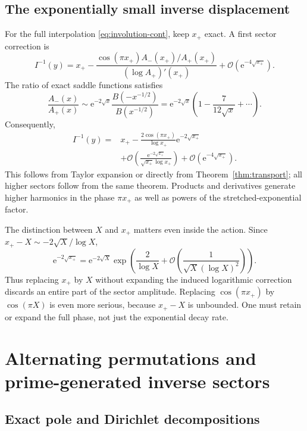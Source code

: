\documentclass[11pt,a4paper]{article}
\numberwithin{equation}{section}
\theoremstyle{definition}
\theoremstyle{remark}
\newcommand{\ee}{\mathrm e}
\newcommand{\bigO}{\mathcal O}
\begin{document}
\subsection{The exponentially small inverse displacement}

For the full interpolation \eqref{eq:involution-cont}, keep $x_+$ exact. A first sector correction is
\begin{equation}
 I^{-1}(y)=x_+-
 \frac{\cos(\pi x_+)A_-(x_+)/A_+(x_+)}{(\log A_+)'(x_+)}
        +\bigO(\ee^{-4\sqrt{x_+}}).
 \label{eq:involution-inverse-sector}
\end{equation}
The ratio of exact saddle functions satisfies
\[
 \frac{A_-(x)}{A_+(x)}
 \sim\ee^{-2\sqrt x}\frac{B(-x^{-1/2})}{B(x^{-1/2})}
 =\ee^{-2\sqrt x}\left(1-\frac7{12\sqrt x}+\cdots\right).
\]
Consequently,
\begin{align}
 I^{-1}(y)={}&x_+-\frac{2\cos(\pi x_+)}{\log x_+}\ee^{-2\sqrt{x_+}}
 \nonumber\\
 &+\bigO\!\left(\frac{\ee^{-2\sqrt{x_+}}}{\sqrt{x_+}\log x_+}\right)
 +\bigO(\ee^{-4\sqrt{x_+}}).
 \label{eq:involution-inverse-leading}
\end{align}
This follows from Taylor expansion or directly from Theorem~\ref{thm:transport}; all higher sectors follow from the same theorem. Products and derivatives generate higher harmonics in the phase $\pi x_+$ as well as powers of the stretched-exponential factor.

The distinction between $X$ and $x_+$ matters even inside the action. Since
$x_+-X\sim-2\sqrt X/\log X$,
\[
 \ee^{-2\sqrt{x_+}}
 =\ee^{-2\sqrt X}\exp\left(\frac2{\log X}
             +\bigO\!\left(\frac1{\sqrt X(\log X)^2}\right)\right).
\]
Thus replacing $x_+$ by $X$ without expanding the induced logarithmic correction discards an entire part of the sector amplitude. Replacing $\cos(\pi x_+)$ by $\cos(\pi X)$ is even more serious, because $x_+-X$ is unbounded. One must retain or expand the full phase, not just the exponential decay rate.

\section{Alternating permutations and prime-generated inverse sectors}
\label{sec:zigzag}

\subsection{Exact pole and Dirichlet decompositions}
\end{document}
